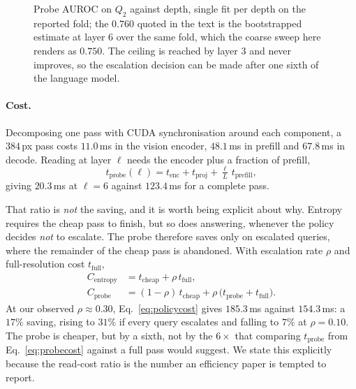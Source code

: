 \documentclass[10pt,twocolumn]{article}
\theoremstyle{plain}
\begin{document}
\begin{figure}[t]
\centering
{}
\caption{Probe AUROC on $Q_2$ against depth, single fit per depth on the
reported fold; the $0.760$ quoted in the text is the bootstrapped estimate at
layer 6 over the same fold, which the coarse sweep here renders as $0.750$. The
ceiling is reached by layer 3 and never improves, so the escalation decision
can be made after one sixth of the language model.}
\label{fig:layers}
\end{figure}

\paragraph{Cost.} Decomposing one pass with CUDA synchronisation around each
component, a $384$\,px pass costs $11.0$\,ms in the vision encoder, $48.1$\,ms
in prefill and $67.8$\,ms in decode. Reading at layer $\ell$ needs the encoder
plus a fraction of prefill,
\begin{equation}
t_{\text{probe}}(\ell) = t_{\text{enc}} + t_{\text{proj}} + \tfrac{\ell}{L}\,t_{\text{prefill}},
\label{eq:probecost}
\end{equation}
giving $20.3$\,ms at $\ell=6$ against $123.4$\,ms for a complete pass.

That ratio is \emph{not} the saving, and it is worth being explicit about why.
Entropy requires the cheap pass to finish, but so does answering, whenever the
policy decides \emph{not} to escalate. The probe therefore saves only on
escalated queries, where the remainder of the cheap pass is abandoned. With
escalation rate $\rho$ and full-resolution cost $t_{\text{full}}$,
\begin{align}
C_{\text{entropy}} &= t_{\text{cheap}} + \rho\, t_{\text{full}},\\
C_{\text{probe}}   &= (1-\rho)\,t_{\text{cheap}} + \rho\,\bigl(t_{\text{probe}} + t_{\text{full}}\bigr).
\label{eq:policycost}
\end{align}
At our observed $\rho \approx 0.30$, Eq.~\ref{eq:policycost} gives $185.3$\,ms
against $154.3$\,ms: a $17\%$ saving, rising to $31\%$ if every query escalates
and falling to $7\%$ at $\rho=0.10$. The probe is cheaper, but by a sixth, not
by the $6\times$ that comparing $t_{\text{probe}}$ from Eq.~\ref{eq:probecost}
against a full pass would suggest. We state this explicitly because the
read-cost ratio is the number an efficiency paper is tempted to report.
\end{document}
